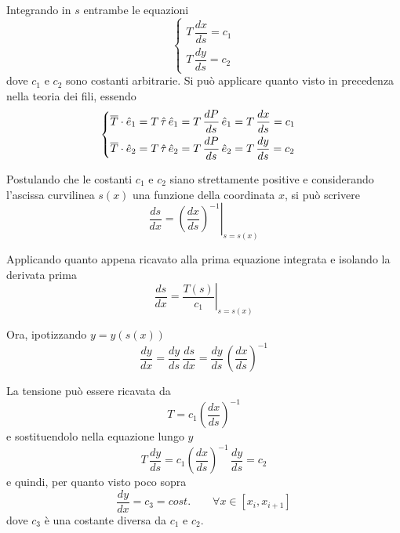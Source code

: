Integrando in $s$ entrambe le equazioni
\[
\begin{cases} 
T\,\dfrac{dx}{ds} = c_1\\[1.5ex]
  T\,\dfrac{dy}{ds} = c_2
\end{cases}
\]
dove $c_1$ e $c_2$ sono costanti arbitrarie. Si può applicare quanto visto in precedenza nella teoria dei fili, essendo
\[
\begin{cases}
\overline{T}\cdot\hat{e}_1 = T\,\hat{\tau}\,\hat{e}_1 = T\,\dfrac{dP}{ds}\,\hat{e}_1 = T\,\dfrac{dx}{ds} = c_1\\[1.5ex]
\overline{T}\cdot\hat{e}_2 = T\,\hat{\tau}\,\hat{e}_2 = T\,\dfrac{dP}{ds}\,\hat{e}_2 = T\,\dfrac{dy}{ds} = c_2
\end{cases}
\]

Postulando che le costanti $c_1$ e $c_2$ siano strettamente positive e considerando l'ascissa curvilinea $s(x)$ una funzione della coordinata $x$, si può scrivere
\[
\dfrac{ds}{dx} = \left.\left(\dfrac{dx}{ds}\right)^{-1}\right|_{s = s(x)} 
\]

Applicando quanto appena ricavato alla prima equazione integrata e isolando la derivata prima
\[
\dfrac{ds}{dx} = \left.\dfrac{T(s)}{c_1}\right|_{s = s(x)}
\]

Ora, ipotizzando $y = y(s(x))$
\[
\dfrac{dy}{dx} = \dfrac{dy}{ds}\,\dfrac{ds}{dx} = \dfrac{dy}{ds}\,\left(\dfrac{dx}{ds}\right)^{-1}
\]

La tensione può essere ricavata da
\[
T = c_1\left(\dfrac{dx}{ds}\right)^{-1}
\]
e sostituendolo nella equazione lungo $y$
\[
T\,\dfrac{dy}{ds} = c_1\left(\dfrac{dx}{ds}\right)^{-1}\,\dfrac{dy}{ds} = c_2
\]
e quindi, per quanto visto poco sopra
\begin{equation}
\label{eq:tratto_filo_costante}
\dfrac{dy}{dx} = c_3 = cost.\qquad \forall x\in[x_i, x_{i+1}]
\end{equation}
dove $c_3$ è una costante diversa da $c_1$ e $c_2$.

